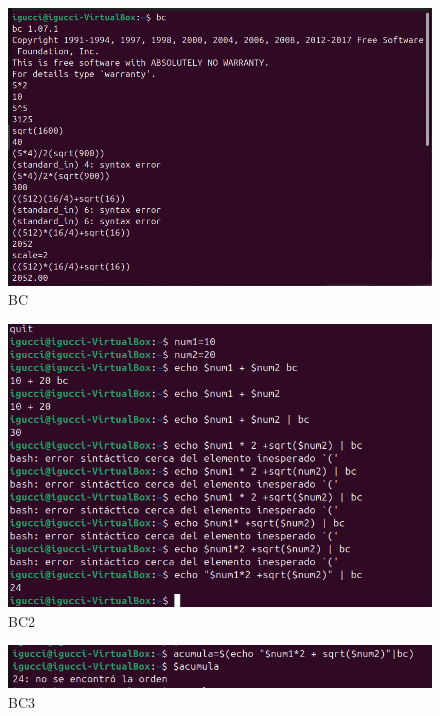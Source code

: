 \documentclass[11pt,twoside]{book}
\begin{document}
\begin{figure}
    \centering
    \includegraphics[width=1
    \linewidth]{bc1.png}
    \caption{BC }
\end{figure}
\begin{figure}
    \centering
    \includegraphics[width=1\linewidth]{bc2.png}
    \caption{BC2}
\end{figure}
\begin{figure}
    \centering
    \includegraphics[width=1\linewidth]{BC3.png}
    \caption{BC3}
\end{figure}
\end{document}
